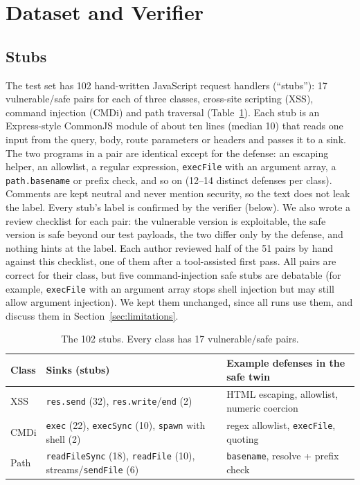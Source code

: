\section{Dataset and Verifier}
\label{sec:dataset}

\subsection{Stubs}
The test set has 102 hand-written JavaScript request handlers (``stubs''): 17 vulnerable/safe pairs for each of
three classes, cross-site scripting (XSS), command injection (CMDi) and path traversal (Table~\ref{tab:dataset}).
Each stub is an Express-style CommonJS module of about ten lines (median 10) that reads one input from the query,
body, route parameters or headers and passes it to a sink. The two programs in a pair are identical except for the
defense: an escaping helper, an allowlist, a regular expression, \texttt{execFile} with an argument array, a
\texttt{path.basename} or prefix check, and so on (12--14 distinct defenses per class). Comments are kept
neutral and never mention security, so the text does not leak the label. Every stub's label is confirmed by the verifier
(below). We also wrote a review checklist for each pair: the vulnerable version is exploitable, the safe version
is safe beyond our test payloads, the two differ only by the defense, and nothing hints at the label. Each
author reviewed half of the 51 pairs by hand against this checklist, one of them after a tool-assisted first pass.
All pairs are correct for their class, but five command-injection safe stubs are debatable (for example,
\texttt{execFile} with an argument array stops shell injection but may still allow argument injection). We kept them
unchanged, since all runs use them, and discuss them in Section~\ref{sec:limitations}.

\begin{table}[t]
\centering
\caption{The 102 stubs. Every class has 17 vulnerable/safe pairs.}
\label{tab:dataset}
\footnotesize
\begin{tabular}{@{}p{0.75cm}p{3.6cm}p{3.6cm}@{}}
\toprule
Class & Sinks (stubs) & Example defenses in the safe twin \\
\midrule
XSS  & \texttt{res.send} (32), \texttt{res.write}/\texttt{end} (2) & HTML escaping, allowlist, numeric coercion \\
CMDi & \texttt{exec} (22), \texttt{execSync} (10), \texttt{spawn} with shell (2) & regex allowlist, \texttt{execFile}, quoting \\
Path & \texttt{readFileSync} (18), \texttt{readFile} (10), streams/\texttt{sendFile} (6) & \texttt{basename}, resolve + prefix check \\
\bottomrule
\end{tabular}
\end{table}

